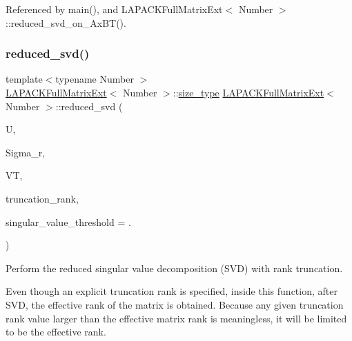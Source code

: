 Referenced by main(), and L\+A\+P\+A\+C\+K\+Full\+Matrix\+Ext$<$ Number $>$\+::reduced\+\_\+svd\+\_\+on\+\_\+\+Ax\+B\+T().

\mbox{\label{classLAPACKFullMatrixExt_a0a6e1d0e88bc84b372b1d0a0f4b79f86}} 
\subsubsection{\texorpdfstring{reduced\+\_\+svd()}{reduced\_svd()}}
{\footnotesize\ttfamily template$<$typename Number $>$ \\
\hyperlink{classLAPACKFullMatrixExt}{L\+A\+P\+A\+C\+K\+Full\+Matrix\+Ext}$<$ Number $>$\+::\hyperlink{classLAPACKFullMatrixExt_a5cf5f4a6104dc17029210b5ca52bf574}{size\+\_\+type} \hyperlink{classLAPACKFullMatrixExt}{L\+A\+P\+A\+C\+K\+Full\+Matrix\+Ext}$<$ Number $>$\+::reduced\+\_\+svd (\begin{DoxyParamCaption}\item[{\hyperlink{classLAPACKFullMatrixExt}{L\+A\+P\+A\+C\+K\+Full\+Matrix\+Ext}$<$ Number $>$ \&}]{U,  }\item[{std\+::vector$<$ typename numbers\+::\+Number\+Traits$<$ Number $>$\+::real\+\_\+type $>$ \&}]{Sigma\+\_\+r,  }\item[{\hyperlink{classLAPACKFullMatrixExt}{L\+A\+P\+A\+C\+K\+Full\+Matrix\+Ext}$<$ Number $>$ \&}]{VT,  }\item[{\hyperlink{classLAPACKFullMatrixExt_a5cf5f4a6104dc17029210b5ca52bf574}{size\+\_\+type}}]{truncation\+\_\+rank,  }\item[{Number}]{singular\+\_\+value\+\_\+threshold = {.} }\end{DoxyParamCaption})}

Perform the reduced singular value decomposition (S\+VD) with rank truncation.


\begin{DoxyDescription}
\item[Note ]Even though an explicit truncation rank is specified, inside this function, after S\+VD, the effective rank of the matrix is obtained. Because any given truncation rank value larger than the effective matrix rank is meaningless, it will be limited to be the effective rank. 
\end{DoxyDescription}


